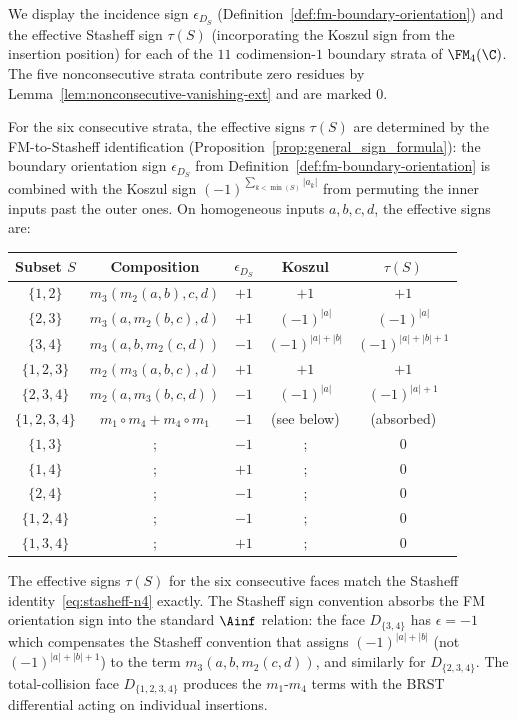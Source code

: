 \begin{computation}[Explicit boundary signs for $n = 4$;
\ClaimStatusProvedHere]%
We display the incidence sign \(\epsilon_{D_S}\)
(Definition~\ref{def:fm-boundary-orientation}) and the
effective Stasheff sign \(\tau(S)\) (incorporating the
Koszul sign from the insertion position) for each of the
$11$ codimension-$1$ boundary strata of $\FM_4(\C)$.
The five nonconsecutive strata contribute zero residues
by Lemma~\ref{lem:nonconsecutive-vanishing-ext} and are
marked $0$.

For the six consecutive strata, the effective signs
\(\tau(S)\) are determined by the FM-to-Stasheff
identification
(Proposition~\ref{prop:general_sign_formula}):
the boundary orientation sign
\(\epsilon_{D_S}\) from
Definition~\ref{def:fm-boundary-orientation} is combined with
the Koszul sign $(-1)^{\sum_{k < \min(S)} |a_k|}$ from
permuting the inner inputs past the outer ones. On homogeneous
inputs $a, b, c, d$, the effective signs are:

\begin{center}
\renewcommand{\arraystretch}{1.15}
\begin{tabular}{c|c|c|c|c}
\textbf{Subset $S$}
 & \textbf{Composition}
 & \(\epsilon_{D_S}\)
 & \textbf{Koszul}
 & \(\tau(S)\) \\
\hline
$\{1,2\}$ & $m_3(m_2(a,b),c,d)$ & $+1$ & $+1$ & $+1$ \\
$\{2,3\}$ & $m_3(a,m_2(b,c),d)$ & $+1$ & $(-1)^{|a|}$ & $(-1)^{|a|}$ \\
$\{3,4\}$ & $m_3(a,b,m_2(c,d))$ & $-1$ & $(-1)^{|a|+|b|}$
 & $(-1)^{|a|+|b|+1}$ \\
$\{1,2,3\}$ & $m_2(m_3(a,b,c),d)$ & $+1$ & $+1$ & $+1$ \\
$\{2,3,4\}$ & $m_2(a,m_3(b,c,d))$ & $-1$ & $(-1)^{|a|}$
 & $(-1)^{|a|+1}$ \\
$\{1,2,3,4\}$ & $m_1 \circ m_4 + m_4 \circ m_1$ & $-1$ & (see below)
 & (absorbed) \\[4pt]
\hline
$\{1,3\}$ &; & $-1$ &; & $0$ \\
$\{1,4\}$ &; & $+1$ &; & $0$ \\
$\{2,4\}$ &; & $-1$ &; & $0$ \\
$\{1,2,4\}$ &; & $-1$ &; & $0$ \\
$\{1,3,4\}$ &; & $+1$ &; & $0$
\end{tabular}
\end{center}

\noindent
The effective signs \(\tau(S)\) for the six consecutive
faces match the Stasheff identity~\eqref{eq:stasheff-n4}
exactly. The Stasheff sign convention absorbs the FM
orientation sign into the standard $\Ainf$ relation:
the face $D_{\{3,4\}}$ has $\epsilon = -1$ which
compensates the Stasheff convention that assigns
$(-1)^{|a|+|b|}$ (not $(-1)^{|a|+|b|+1}$) to the
term $m_3(a,b,m_2(c,d))$, and similarly for
$D_{\{2,3,4\}}$. The total-collision face
$D_{\{1,2,3,4\}}$ produces the $m_1$-$m_4$ terms with
the BRST differential acting on individual insertions.


\end{computation}
